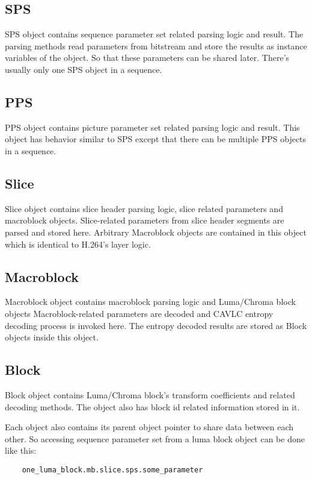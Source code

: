\documentclass[../main.tex]{subfiles}
\begin{document}
\subsection{SPS}
SPS object contains sequence parameter set related parsing logic and result.
The parsing methods read parameters from bitstream and store the results as instance variables of the object.
So that these parameters can be shared later. 
There's usually only one SPS object in a sequence.

\subsection{PPS}
PPS object contains picture parameter set related parsing logic and result.
This object has behavior similar to SPS except that there can be multiple PPS objects in a sequence.

\subsection{Slice}
Slice object contains slice header parsing logic, slice related parameters and macroblock objects.
Slice-related parameters from slice header segments are parsed and stored here.
Arbitrary Macroblock objects are contained in this object which is identical to H.264's layer logic.

\subsection{Macroblock}
Macroblock object contains macroblock parsing logic and Luma/Chroma block objects
Macroblock-related parameters are decoded and CAVLC entropy decoding process is invoked here.
The entropy decoded results are stored as Block objects inside this object.

\subsection{Block}
Block object contains Luma/Chroma block's transform coefficients and related decoding methods.
The object also has block id related information stored in it.

\bigskip

Each object also contains its parent object pointer to share data between each other.
So accessing sequence parameter set from a luma block object can be done like this:

\begin{verbatim}
    one_luma_block.mb.slice.sps.some_parameter
\end{verbatim}
\end{document}
